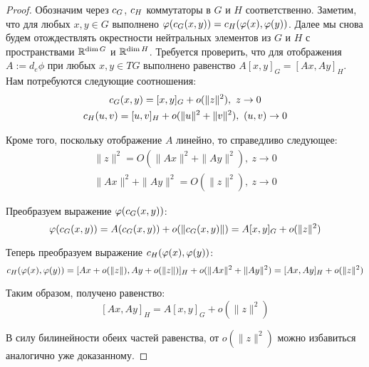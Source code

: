 \begin{proof}
	Обозначим через $c_G$, $c_H$ коммутаторы в $G$ и $H$ соответственно. Заметим, что для любых $x, y \in G$ выполнено $\varphi(c_G(x, y)) = c_H(\varphi(x), \varphi(y))$. Далее мы снова будем отождествлять окрестности нейтральных элементов из $G$ и $H$ с пространствами $\mathbb{R}^{\dim G}$ и $\mathbb{R}^{\dim H}$. Требуется проверить, что для отображения $A := d_e\phi$ при любых $x, y \in TG$ выполнено равенство $A[x, y]_G = [Ax, Ay]_H$. Нам потребуются следующие соотношения:
	\begin{gather*}
		c_G(x, y) = [x, y]_G + o(\|z\|^2),~z \to 0
		\\
		c_H(u, v) = [u, v]_H + o(\|u\|^2 + \|v\|^2),~(u, v) \to 0
	\end{gather*}
	
	Кроме того, поскольку отображение $A$ линейно, то справедливо следующее:
	\begin{gather*}
		\|z\|^2 = O(\|Ax\|^2 + \|Ay\|^2),~z \to 0
		\\
		\|Ax\|^2 + \|Ay\|^2 = O(\|z\|^2),~z \to 0
	\end{gather*}

	Преобразуем выражение $\varphi(c_G(x, y))$:
	\[\varphi(c_G(x, y)) = A(c_G(x, y)) + o(\|c_G(x, y)\|) = A[x, y]_G + o(\|z\|^2)\]
	
	Теперь преобразуем выражение $c_H(\varphi(x), \varphi(y))$:
	\[c_H(\varphi(x), \varphi(y)) = [Ax + o(\|z\|), Ay + o(\|z\|)]_H + o(\|Ax\|^2 + \|Ay\|^2) = [Ax, Ay]_H + o(\|z\|^2)\]
	
	Таким образом, получено равенство:
	\[[Ax, Ay]_H = A[x, y]_G + o(\|z\|^2)\]
	
	В силу билинейности обеих частей равенства, от $o(\|z\|^2)$ можно избавиться аналогично уже доказанному.
\end{proof}